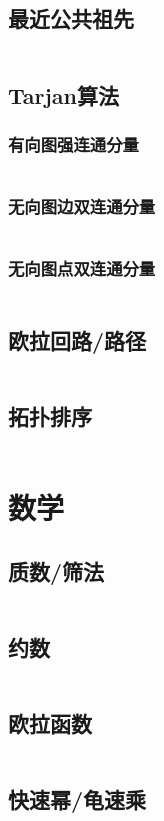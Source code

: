 \documentclass[a4paper,12pt]{article}
\begin{document}
\subsection{最近公共祖先} %
\inputminted[breaklines]{c++}{graph/lca/lca.cc}
\subsection{Tarjan算法} %
\subsubsection{有向图强连通分量} 
\inputminted[breaklines]{c++}{graph/tarjan/scc.cc}
\subsubsection{无向图边双连通分量} 
\inputminted[breaklines]{c++}{graph/tarjan/edcc.cc}
\subsubsection{无向图点双连通分量} 
\inputminted[breaklines]{c++}{graph/tarjan/vdcc.cc}
\subsection{欧拉回路/路径} %
\inputminted[breaklines]{c++}{graph/eluer/eluer.cc}
\subsection{拓扑排序} %
\inputminted[breaklines]{c++}{graph/topsort/top.cc}

\newpage
\section{数学}
\subsection{质数/筛法}
\inputminted[breaklines]{c++}{math/prime.cc}
\subsection{约数}
\inputminted[breaklines]{c++}{math/yueshu.cc}
\subsection{欧拉函数}
\inputminted[breaklines]{c++}{math/eluer.cc}
\subsection{快速幂/龟速乘}
\inputminted[breaklines]{c++}{math/qmi.cc}
\end{document}

